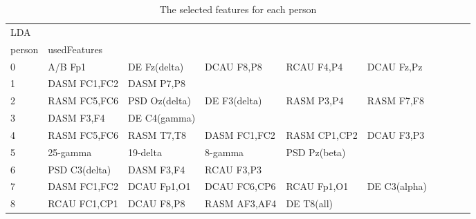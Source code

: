 \begin{landscape}
\begin{table}[]
\centering
\caption{The selected features for each person}
\begin{tabular}{l|llllllll}
LDA      &                &                &                &                &                &                &               &                &               &               \\
person   & usedFeatures   &                &                &                &                &                &               &                &               &               \\
0        & A/B Fp1        & DE Fz(delta)   & DCAU F8,P8     & RCAU F4,P4     & DCAU Fz,Pz     &                &               &                &               &               \\
1        & DASM FC1,FC2   & DASM P7,P8     &                &                &                &                &               &                &               &               \\
2        & RASM FC5,FC6   & PSD Oz(delta)  & DE F3(delta)   & RASM P3,P4     & RASM F7,F8     &                &               &                &               &               \\
3        & DASM F3,F4     & DE C4(gamma)   &                &                &                &                &               &                &               &               \\
4        & RASM FC5,FC6   & RASM T7,T8     & DASM FC1,FC2   & RASM CP1,CP2   & DCAU F3,P3     &                &               &                &               &               \\
5        & 25-gamma       & 19-delta       & 8-gamma        & PSD Pz(beta)   &                &                &               &                &               &               \\
6        & PSD C3(delta)  & DASM F3,F4     & RCAU F3,P3     &                &                &                &               &                &               &               \\
7        & DASM FC1,FC2   & DCAU Fp1,O1    & DCAU FC6,CP6   & RCAU Fp1,O1    & DE C3(alpha)   &                &               &                &               &               \\
8        & RCAU FC1,CP1   & DCAU F8,P8     & RASM AF3,AF4   & DE T8(all)     &                &                &               &                &               &               \\

\end{tabular}
\end{table}
\end{landscape}
